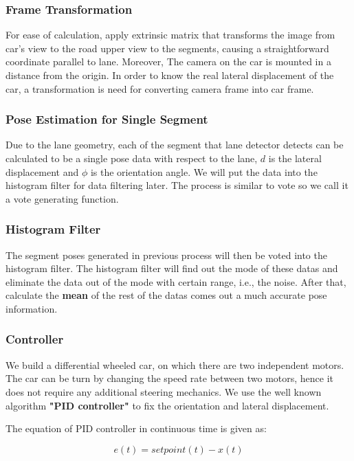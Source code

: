 \documentclass[conference]{IEEEtran}
\begin{document}
\subsubsection{Frame Transformation}

For ease of calculation, apply extrinsic matrix that transforms the image from car's view to the road upper view  to the segments, causing a straightforward coordinate parallel to lane.
Moreover, The camera on the car is mounted in a distance from the origin. In order to know the real lateral displacement of the car, a transformation is need for converting camera frame into car frame.

\subsubsection{Pose Estimation for Single Segment}

Due to the lane geometry, each of the segment that lane detector detects can be calculated to be a single pose data with respect to the lane, $d$ is the lateral displacement and $\phi$ is the orientation angle. We will put the data into the histogram filter for data filtering later. The process is similar to vote so we call it a vote generating function.

\subsubsection{Histogram Filter}

The segment poses generated in previous process will then be voted into the histogram filter. The histogram filter will find out the mode of these datas and eliminate the data out of the mode with certain range, i.e., the noise. After that, calculate the \textbf{mean} of the rest of the datas comes out a much accurate pose information.

\subsubsection{Controller}We build a differential wheeled car, on which there are two independent motors. The car can be turn by changing the speed rate between two motors, hence it does not require any additional steering mechanics.
	We use the well known algorithm \textbf{"PID controller"} to fix the orientation and lateral displacement.

The equation of PID controller in continuous time is given as:

\[e(t) = setpoint(t) - x(t)\]
\end{document}
